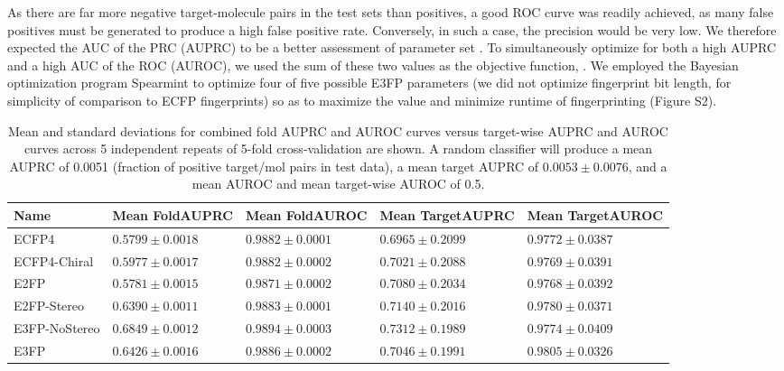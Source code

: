 \documentclass[../../main.tex]{subfiles}
\begin{document}
\begin{refsection}
	As there are far more negative target-molecule pairs in the test sets than positives, a good ROC curve was readily achieved, as many false positives must be generated to produce a high false positive rate.
	Conversely, in such a case, the precision would be very low.
	We therefore expected the AUC of the PRC (AUPRC) to be a better assessment of parameter set \supercite{saito_2015}.
	To simultaneously optimize for both a high AUPRC and a high AUC of the ROC (AUROC), we used the sum of these two values as the objective function, \AUCsum{}.
	We employed the Bayesian optimization program Spearmint  \supercite{snoek_2012} to optimize four of five possible E3FP parameters  (we did not optimize fingerprint bit length, for simplicity of comparison to ECFP fingerprints) so as to maximize the \AUCsum{} value and minimize runtime of fingerprinting  (Figure S2).

	\begin{table}
		\caption[Mean and standard deviations for combined fold AUPRC and AUROC curves]{
			Mean and standard deviations for combined fold AUPRC and AUROC curves versus target-wise AUPRC and AUROC curves across 5 independent repeats of 5-fold cross-validation are shown.
			A random classifier will produce a mean AUPRC of 0.0051  (fraction of positive target/mol pairs in test data), a mean target AUPRC of $0.0053 \pm 0.0076$, and a mean AUROC and mean target-wise AUROC of 0.5.
		}
		\label{table:table1}
		\begin{tabularx}{0.99\textwidth}{
				X
				>{\centering\arraybackslash}X
				>{\centering\arraybackslash}X
				>{\centering\arraybackslash}X
				>{\centering\arraybackslash}X
			}
			\toprule
			Name          & Mean Fold\newline AUPRC & Mean Fold\newline AUROC & Mean Target\newline AUPRC & Mean Target\newline AUROC \\
			\midrule
			ECFP4         & $0.5799 \pm 0.0018$     & $0.9882 \pm 0.0001$     & $0.6965 \pm 0.2099$       & $0.9772 \pm 0.0387$       \\
			ECFP4-Chiral  & $0.5977 \pm 0.0017$     & $0.9882 \pm 0.0002$     & $0.7021 \pm 0.2088$       & $0.9769 \pm 0.0391$       \\
			E2FP          & $0.5781 \pm 0.0015$     & $0.9871 \pm 0.0002$     & $0.7080 \pm 0.2034$       & $0.9768 \pm 0.0392$       \\
			E2FP-Stereo   & $0.6390 \pm 0.0011$     & $0.9883 \pm 0.0001$     & $0.7140 \pm 0.2016$       & $0.9780 \pm 0.0371$       \\
			E3FP-NoStereo & $0.6849 \pm 0.0012$     & $0.9894 \pm 0.0003$     & $0.7312 \pm 0.1989$       & $0.9774 \pm 0.0409$       \\
			E3FP          & $0.6426 \pm 0.0016$     & $0.9886 \pm 0.0002$     & $0.7046 \pm 0.1991$       & $0.9805 \pm 0.0326$       \\
			\bottomrule
		\end{tabularx}
	\end{table}


\end{refsection}
\end{document}
